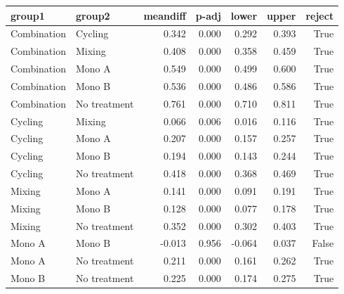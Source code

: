 \begin{tabular}{llrrrrr}
\toprule
group1 & group2 & meandiff & p-adj & lower & upper & reject \\
\midrule
Combination & Cycling & 0.342 & 0.000 & 0.292 & 0.393 & True \\
Combination & Mixing & 0.408 & 0.000 & 0.358 & 0.459 & True \\
Combination & Mono A & 0.549 & 0.000 & 0.499 & 0.600 & True \\
Combination & Mono B & 0.536 & 0.000 & 0.486 & 0.586 & True \\
Combination & No treatment & 0.761 & 0.000 & 0.710 & 0.811 & True \\
Cycling & Mixing & 0.066 & 0.006 & 0.016 & 0.116 & True \\
Cycling & Mono A & 0.207 & 0.000 & 0.157 & 0.257 & True \\
Cycling & Mono B & 0.194 & 0.000 & 0.143 & 0.244 & True \\
Cycling & No treatment & 0.418 & 0.000 & 0.368 & 0.469 & True \\
Mixing & Mono A & 0.141 & 0.000 & 0.091 & 0.191 & True \\
Mixing & Mono B & 0.128 & 0.000 & 0.077 & 0.178 & True \\
Mixing & No treatment & 0.352 & 0.000 & 0.302 & 0.403 & True \\
Mono A & Mono B & -0.013 & 0.956 & -0.064 & 0.037 & False \\
Mono A & No treatment & 0.211 & 0.000 & 0.161 & 0.262 & True \\
Mono B & No treatment & 0.225 & 0.000 & 0.174 & 0.275 & True \\
\bottomrule
\end{tabular}
